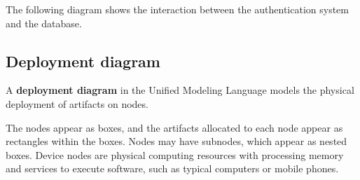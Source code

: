 \documentclass[12pt]{report}
\renewcommand\emph{\textbf}
\begin{document}
                \newpage

                The following diagram shows the interaction between the authentication system and the database.


                \newpage

                \newpage

            \subsection{Deployment diagram}

                A \emph{deployment diagram} in the Unified Modeling Language models the physical deployment of artifacts on nodes.

                The nodes appear as boxes, and the artifacts allocated to each node appear as rectangles within the boxes. Nodes may have subnodes, which appear as nested boxes. Device nodes are physical computing resources with processing memory and services to execute software, such as typical computers or mobile phones.

\end{document}
